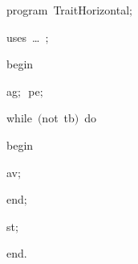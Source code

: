 
{
\parindent {}
\medskip

\carrenoir
\vspace{\neglskip}\mbox{\blc  \idt  \mcl program\idt \ TraitHorizontal$;$
}\par 
\vspace{\neglskip}\mbox{\blc \blk\idt \mcl uses\idt \ \ldots\ $;$
}\par 
\vspace{\neglskip}\mbox{\blc  \idt  \mcl begin\idt }\par 
\vspace{\neglskip}\mbox{\blc  \blk\idt  ag$;$\ pe$;$}\par 
\pagebreak[3] 
\vspace{\neglskip}\mbox{\blc  \blk\idt  \mcl while\idt \ $($\mcl not\idt \ tb$)$\ \mcl do\idt }\par 
\vspace{\neglskip}\mbox{\blc  \blk\blk\idt  \mcl begin\idt }\par 
\vspace{\neglskip}\mbox{\blc  \blk\blk\blk\idt  av$;$\ }\par 
\vspace{\neglskip}\mbox{\blc  \blk\blk\idt  \mcl end\idt $;$}\par 
\vspace{\neglskip}\mbox{\blc  \blk\idt  st$;$}\par 
\vspace{\neglskip}\mbox{\blc  \idt  \mcl end\idt $.$}\par 

\medskip }

